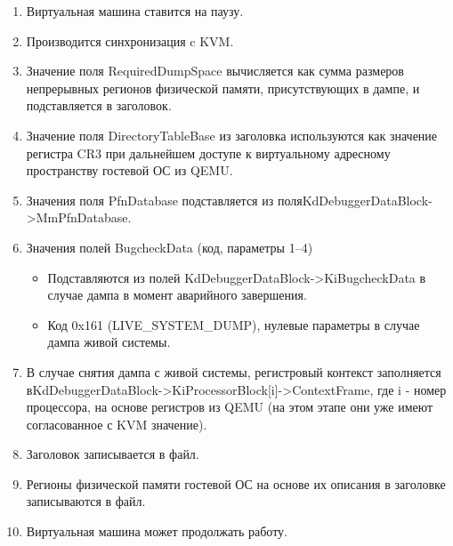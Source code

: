 \documentclass{mipt-thesis-bs}
\begin{document}
\begin{enumerate}
    \item Виртуальная машина ставится на паузу.
    \item Производится синхронизация c KVM.
    \item Значение поля RequiredDumpSpace вычисляется как сумма размеров непрерывных регионов физической памяти, присутствующих в дампе, и подставляется в заголовок.
    \item Значение поля DirectoryTableBase из заголовка используются как значение регистра CR3 при дальнейшем доступе к виртуальному адресному пространству гостевой ОС из QEMU.
    \item Значения поля PfnDatabase подставляется из поля\newline KdDebuggerDataBlock->MmPfnDatabase.
    \item Значения полей BugcheckData (код, параметры 1--4)
    \begin{itemize}
        \item Подставляются из полей KdDebuggerDataBlock->KiBugcheckData в случае дампа в момент аварийного завершения.
        \item Код 0x161 (LIVE{\_}SYSTEM{\_DUMP}), нулевые параметры в случае дампа живой системы.
    \end{itemize}
    \item В случае снятия дампа с живой системы,  регистровый контекст заполняется в\newline KdDebuggerDataBlock->KiProcessorBlock[i]->ContextFrame, где i - номер процессора, на основе регистров из QEMU (на этом этапе они уже имеют согласованное с KVM значение).
    \item Заголовок записывается в файл.
    \item Регионы физической памяти гостевой ОС на основе их описания в заголовке записываются в файл.
    \item Виртуальная машина может продолжать работу.
\end{enumerate}



\end{document}
